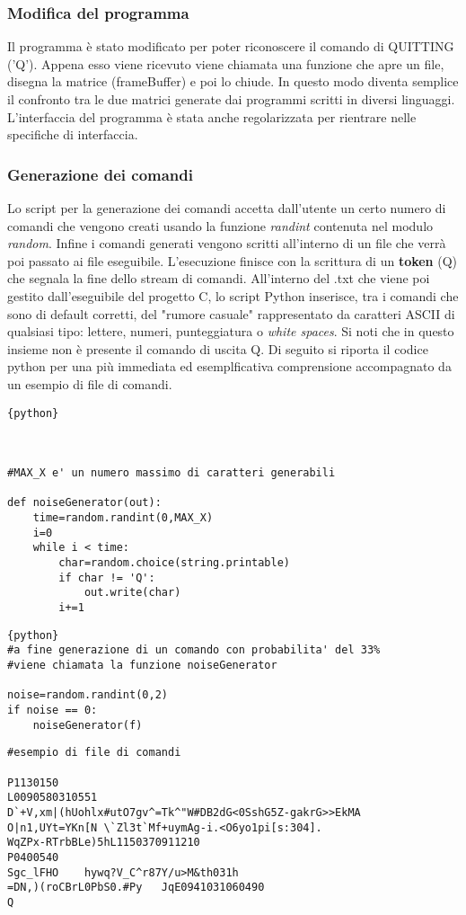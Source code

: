 \documentclass{article}
\begin{document}
	\subsubsection*{Modifica del programma}
		Il programma è stato modificato per poter riconoscere il comando di QUITTING ('Q'). Appena esso viene ricevuto
		viene chiamata una funzione che apre un file, disegna la matrice (frameBuffer) e poi lo chiude. In questo modo 
		diventa semplice il confronto tra le due matrici generate dai programmi scritti in diversi linguaggi.
		L'interfaccia del programma è stata anche regolarizzata per rientrare nelle specifiche di interfaccia.

	\subsubsection*{Generazione dei comandi}
		Lo script per la generazione dei comandi accetta dall'utente un certo numero di comandi che vengono creati usando la funzione \textit{randint} contenuta nel modulo \textit{random}. Infine i comandi generati vengono scritti all'interno di un file che verrà poi passato ai file eseguibile.
		L'esecuzione finisce con la scrittura di un \textbf{token} (Q) che segnala la fine dello stream di comandi.
		All'interno del .txt che viene poi gestito dall'eseguibile del progetto C, lo script Python inserisce, tra i comandi che sono di default corretti, del "rumore casuale" rappresentato da caratteri ASCII di qualsiasi tipo: lettere, numeri, punteggiatura o \textit{white spaces}. Si noti che in questo insieme non è presente il comando di uscita Q.
		Di seguito si riporta il codice python per una più immediata ed esemplficativa comprensione accompagnato da un esempio di file di comandi.
		\begin{lstlisting}{python}
		
		
		
#MAX_X e' un numero massimo di caratteri generabili

def noiseGenerator(out):
	time=random.randint(0,MAX_X)
	i=0
	while i < time:
		char=random.choice(string.printable)
		if char != 'Q':
			out.write(char)
		i+=1
		\end{lstlisting}
		\begin{lstlisting}{python}
#a fine generazione di un comando con probabilita' del 33% 
#viene chiamata la funzione noiseGenerator

noise=random.randint(0,2)
if noise == 0:
	noiseGenerator(f)
		\end{lstlisting}
		\begin{lstlisting}
#esempio di file di comandi

P1130150
L0090580310551
D`+V,xm|(hUohlx#utO7gv^=Tk^"W#DB2dG<0SshG5Z-gakrG>>EkMA
O|n1,UYt=YKn[N \`Zl3t`Mf+uymAg-i.<O6yo1pi[s:304].
WqZPx-RTrbBLe)5hL1150370911210
P0400540
Sgc_lFHO	hywq?V_C^r87Y/u>M&th031h
=DN,)(roCBrL0PbS0.#Py	JqE0941031060490
Q
		\end{lstlisting} 
\end{document}
